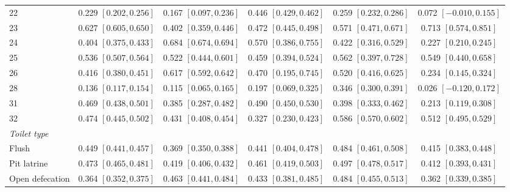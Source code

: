 \begin{landscape}
\begin{longtable}{lccccc}
22 & 0.229 {\scriptsize$[0.202,0.256]$} & 0.167 {\scriptsize$[0.097,0.236]$} & 0.446 {\scriptsize$[0.429,0.462]$} & 0.259 {\scriptsize$[0.232,0.286]$} & 0.072 {\scriptsize$[-0.010,0.155]$} \\
23 & 0.627 {\scriptsize$[0.605,0.650]$} & 0.402 {\scriptsize$[0.359,0.446]$} & 0.472 {\scriptsize$[0.445,0.498]$} & 0.571 {\scriptsize$[0.471,0.671]$} & 0.713 {\scriptsize$[0.574,0.851]$} \\
24 & 0.404 {\scriptsize$[0.375,0.433]$} & 0.684 {\scriptsize$[0.674,0.694]$} & 0.570 {\scriptsize$[0.386,0.755]$} & 0.422 {\scriptsize$[0.316,0.529]$} & 0.227 {\scriptsize$[0.210,0.245]$} \\
25 & 0.536 {\scriptsize$[0.507,0.564]$} & 0.522 {\scriptsize$[0.444,0.601]$} & 0.459 {\scriptsize$[0.394,0.524]$} & 0.562 {\scriptsize$[0.397,0.728]$} & 0.549 {\scriptsize$[0.440,0.658]$} \\
26 & 0.416 {\scriptsize$[0.380,0.451]$} & 0.617 {\scriptsize$[0.592,0.642]$} & 0.470 {\scriptsize$[0.195,0.745]$} & 0.520 {\scriptsize$[0.416,0.625]$} & 0.234 {\scriptsize$[0.145,0.324]$} \\
28 & 0.136 {\scriptsize$[0.117,0.154]$} & 0.115 {\scriptsize$[0.065,0.165]$} & 0.197 {\scriptsize$[0.069,0.325]$} & 0.346 {\scriptsize$[0.300,0.391]$} & 0.026 {\scriptsize$[-0.120,0.172]$} \\
31 & 0.469 {\scriptsize$[0.438,0.501]$} & 0.385 {\scriptsize$[0.287,0.482]$} & 0.490 {\scriptsize$[0.450,0.530]$} & 0.398 {\scriptsize$[0.333,0.462]$} & 0.213 {\scriptsize$[0.119,0.308]$} \\
32 & 0.474 {\scriptsize$[0.445,0.502]$} & 0.431 {\scriptsize$[0.408,0.454]$} & 0.327 {\scriptsize$[0.230,0.423]$} & 0.586 {\scriptsize$[0.570,0.602]$} & 0.512 {\scriptsize$[0.495,0.529]$} \\
\midrule
\multicolumn{6}{l}{\textit{Toilet type}} \\
Flush & 0.449 {\scriptsize$[0.441,0.457]$} & 0.369 {\scriptsize$[0.350,0.388]$} & 0.441 {\scriptsize$[0.404,0.478]$} & 0.484 {\scriptsize$[0.461,0.508]$} & 0.415 {\scriptsize$[0.383,0.448]$} \\
Pit latrine & 0.473 {\scriptsize$[0.465,0.481]$} & 0.419 {\scriptsize$[0.406,0.432]$} & 0.461 {\scriptsize$[0.419,0.503]$} & 0.497 {\scriptsize$[0.478,0.517]$} & 0.412 {\scriptsize$[0.393,0.431]$} \\
Open defecation & 0.364 {\scriptsize$[0.352,0.375]$} & 0.463 {\scriptsize$[0.441,0.484]$} & 0.433 {\scriptsize$[0.381,0.485]$} & 0.484 {\scriptsize$[0.455,0.513]$} & 0.362 {\scriptsize$[0.339,0.385]$} \\

\end{longtable}
\end{landscape}
